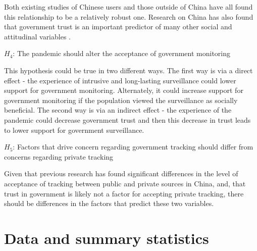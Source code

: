 \documentclass[
  number]{elsarticle}
\begin{document}
Both existing studies of Chinese users and those outside of China have
all found this relationship to be a relatively robust one. Research on
China has also found that government trust is an important predictor of
many other social and attitudinal variables
\citep{chen2017, qiu2012, zhou2018}.

\(H_4\): The pandemic should alter the acceptance of government
monitoring

This hypothesis could be true in two different ways. The first way is
via a direct effect - the experience of intrusive and long-lasting
surveillance could lower support for government monitoring. Alternately,
it could increase support for government monitoring if the population
viewed the surveillance as socially beneficial. The second way is via an
indirect effect - the experience of the pandemic could decrease
government trust and then this decrease in trust leads to lower support
for government surveillance.

\(H_5\): Factors that drive concern regarding government tracking should
differ from concerns regarding private tracking

Given that previous research has found significant differences in the
level of acceptance of tracking between public and private sources in
China, and, that trust in government is likely not a factor for
accepting private tracking, there should be differences in the factors
that predict these two variables.

\section{Data and summary statistics}\label{sec-datasummary}
\end{document}
